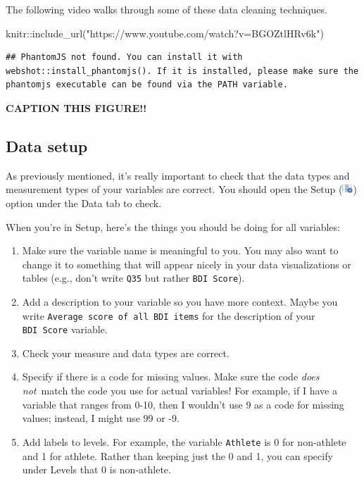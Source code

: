 \documentclass[
]{book}
\newenvironment{Shaded}{\begin{snugshade}}{\end{snugshade}}
\newcommand{\FunctionTok}[1]{\textcolor[rgb]{0.00,0.00,0.00}{#1}}
\newcommand{\NormalTok}[1]{#1}
\newcommand{\SpecialCharTok}[1]{\textcolor[rgb]{0.00,0.00,0.00}{#1}}
\newcommand{\StringTok}[1]{\textcolor[rgb]{0.31,0.60,0.02}{#1}}
\begin{document}
The following video walks through some of these data cleaning techniques.

\begin{Shaded}
\begin{Highlighting}[]
\NormalTok{knitr}\SpecialCharTok{::}\FunctionTok{include\_url}\NormalTok{(}\StringTok{"https://www.youtube.com/watch?v=BGOZtlHRv6k"}\NormalTok{)}
\end{Highlighting}
\end{Shaded}

\begin{verbatim}
## PhantomJS not found. You can install it with webshot::install_phantomjs(). If it is installed, please make sure the phantomjs executable can be found via the PATH variable.
\end{verbatim}

\label{fig:unnamed-chunk-1}\textbf{CAPTION THIS FIGURE!!}

\hypertarget{data-setup}{%
\subsection{Data setup}\label{data-setup}}

As previously mentioned, it's really important to check that the data types and measurement types of your variables are correct. You should open the Setup (\includegraphics[width=0.15625in,height=\textheight]{images/03-jamovi/menu-variable-edit.png}) option under the Data tab to check.

When you're in Setup, here's the things you should be doing for all variables:

\begin{enumerate}
\def\labelenumi{\arabic{enumi}.}
\item
  Make sure the variable name is meaningful to you. You may also want to change it to something that will appear nicely in your data visualizations or tables (e.g., don't write \texttt{Q35} but rather \texttt{BDI\ Score}).
\item
  Add a description to your variable so you have more context. Maybe you write \texttt{Average\ score\ of\ all\ BDI\ items} for the description of your \texttt{BDI\ Score} variable.
\item
  Check your measure and data types are correct.
\item
  Specify if there is a code for missing values. Make sure the code \emph{does not}~match the code you use for actual variables! For example, if I have a variable that ranges from 0-10, then I wouldn't use 9 as a code for missing values; instead, I might use 99 or -9.
\item
  Add labels to levels. For example, the variable \texttt{Athlete} is 0 for non-athlete and 1 for athlete. Rather than keeping just the 0 and 1, you can specify under Levels that 0 is non-athlete.
\end{enumerate}
\end{document}
